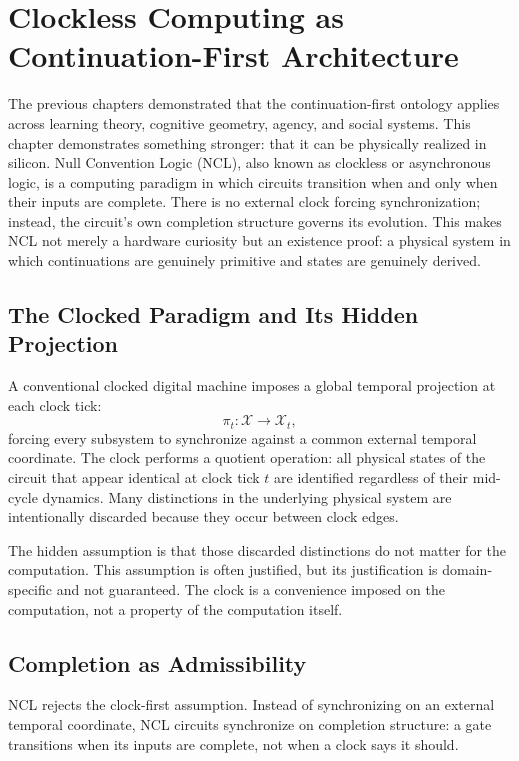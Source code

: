 \documentclass[12pt, oneside]{book}
\theoremstyle{flyxion}
\theoremstyle{definition}
\begin{document}
\chapter{Clockless Computing as Continuation-First
         Architecture}

The previous chapters demonstrated that the
continuation-first ontology applies across learning
theory, cognitive geometry, agency, and social systems.
This chapter demonstrates something stronger: that it
can be physically realized in silicon. Null Convention
Logic (NCL), also known as clockless or asynchronous
logic, is a computing paradigm in which circuits
transition when and only when their inputs are complete.
There is no external clock forcing synchronization;
instead, the circuit's own completion structure governs
its evolution. This makes NCL not merely a hardware
curiosity but an existence proof: a physical system
in which continuations are genuinely primitive and
states are genuinely derived.

\section{The Clocked Paradigm and Its Hidden Projection}

A conventional clocked digital machine imposes a global
temporal projection at each clock tick:
\[
\pi_t : \mathcal{X} \to \mathcal{X}_t,
\]
forcing every subsystem to synchronize against a common
external temporal coordinate. The clock performs a
quotient operation: all physical states of the circuit
that appear identical at clock tick $t$ are identified
regardless of their mid-cycle dynamics. Many distinctions
in the underlying physical system are intentionally
discarded because they occur between clock edges.

The hidden assumption is that those discarded
distinctions do not matter for the computation. This
assumption is often justified, but its justification
is domain-specific and not guaranteed. The clock is
a convenience imposed on the computation, not a
property of the computation itself.

\section{Completion as Admissibility}

NCL rejects the clock-first assumption. Instead of
synchronizing on an external temporal coordinate,
NCL circuits synchronize on completion structure: a
gate transitions when its inputs are complete, not
when a clock says it should.
\end{document}
